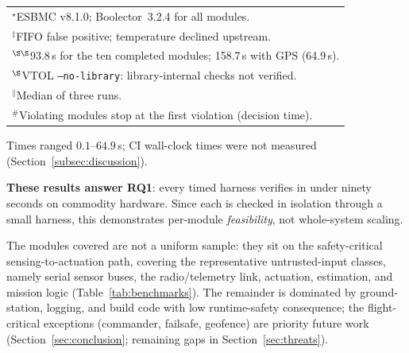 \documentclass[conference]{IEEEtran}
\newcommand{\corr}[1]{#1}
\begin{document}
\begin{table}[t]
\begin{tabular}{@{}lcrccr@{}}
\multicolumn{6}{l}{$^\star$ESBMC v8.1.0; Boolector~3.2.4 for all modules.}\\
\multicolumn{6}{l}{$^\ddagger$FIFO false positive; temperature declined upstream.}\\
\multicolumn{6}{l}{\corr{$^{\S\S}$93.8\,s for the ten completed modules; 158.7\,s with GPS (64.9\,s).}}\\
\multicolumn{6}{l}{$^\S$VTOL \texttt{--no-library}: library-internal checks not verified.}\\
\multicolumn{6}{l}{$^\|$Median of three runs.}\\
\multicolumn{6}{l}{$^{\#}$Violating modules stop at the first violation (decision time).}
\end{tabular}
\end{table}
Times ranged $0.1$--$64.9$\,s; CI wall-clock times were
not measured (Section~\ref{subsec:discussion}).
\begin{rqbox}
\textbf{These results answer RQ1}: every timed harness verifies in under
ninety seconds on commodity hardware. Since each is checked in isolation
through a small harness, this demonstrates per-module
\emph{feasibility}, not whole-system scaling.
\end{rqbox}

The modules covered are not a uniform sample: they sit on the
safety-critical sensing-to-actuation path, covering the
representative untrusted-input classes, namely serial sensor buses, the
radio/telemetry link, actuation, estimation, and mission logic
(Table~\ref{tab:benchmarks}).
The remainder is dominated by ground-station, logging, and
build code with low runtime-safety consequence; the flight-critical
exceptions (commander, failsafe, geofence) are priority future work
(Section~\ref{sec:conclusion}; remaining gaps in
Section~\ref{sec:threats}).
\end{document}

